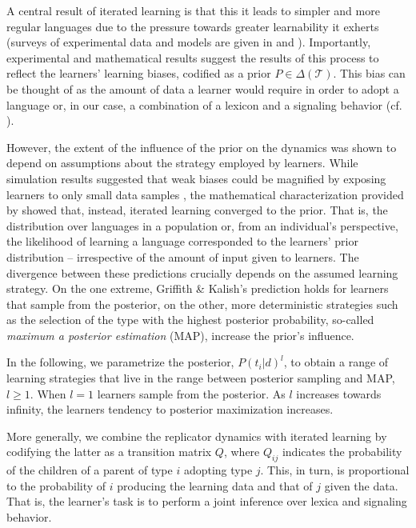 \documentclass[a4paper]{article}
\begin{document}
A central result of iterated learning is that this it leads to simpler and more regular languages due to the pressure towards greater learnability it exherts (surveys of experimental data and models are given in \citealt{kirby+etal:2014} and \citealt{tamariz+kirby:2016}). Importantly, experimental and mathematical results suggest the results of this process to reflect the learners' learning biases, codified as a prior $P \in \Delta(\mathcal{T})$. This bias can be thought of as the amount of data a learner would require in order to adopt a language or, in our case, a combination of a lexicon and a signaling behavior (cf. \citealt[450]{griffiths+kalish:2007}). 

However, the extent of the influence of the prior on the dynamics was shown to depend on assumptions about the strategy employed by learners. While simulation results suggested that weak biases could be magnified by exposing learners to only small data samples \citep{brighton:2002}, the mathematical characterization provided by \citet{griffiths+kalish:2007} showed that, instead, iterated learning converged to the prior. That is, the distribution over languages in a population or, from an individual's perspective, the likelihood of learning a language corresponded to the learners' prior distribution -- irrespective of the amount of input given to learners. The divergence between these predictions crucially depends on the assumed learning strategy. On the one extreme, Griffith \& Kalish's prediction holds for learners that sample from the posterior, on the other, more deterministic strategies such as the selection of the type with the highest posterior probability, so-called {\it maximum a posterior estimation} (MAP), increase the prior's influence.


In the following, we parametrize the posterior, $P(t_i|d)^l$, to obtain a range of learning strategies that live in the range between posterior sampling and MAP, $l \geq 1$. When $l = 1$ learners sample from the posterior. As $l$ increases towards infinity, the learners tendency to posterior maximization increases. 

More generally, we combine the replicator dynamics with iterated learning by codifying the latter as a transition matrix $Q$, where $Q_{ij}$ indicates the probability of the children of a parent of type $i$ adopting type $j$. This, in turn, is proportional to the probability of $i$ producing the learning data and that of $j$ given the data. That is, the learner's task is to perform a joint inference over lexica and signaling behavior.
\end{document}
